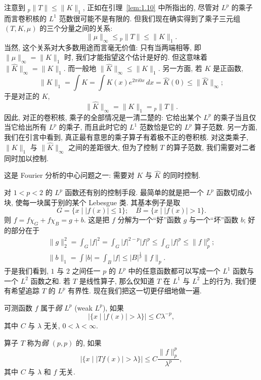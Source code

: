\begin{remark}\label{rem:1.17}
注意到 ${}_p\|T\|\leq\|K\|_1$, 正如在引理~\ref{lem:1.10} 中所指出的, 尽管对 $L^p$ 的乘子而言卷积核的 $L^1$ 范数很可能不是有限的. 但我们现在确实得到了乘子三元组 $(T,K,\mu)$ 的三个分量之间的关系:
\[
\|\mu\|_{\infty}\leq{}_p\|T\|\leq\|K\|_1.
\]
当然, 这个关系对大多数用途而言毫无价值: 只有当两端相等, 即 $\|\mu\|_{\infty}=\|K\|_1$ 时, 我们才能指望这个估计是好的. 但这意味着 $\|\hat{K}\|_{\infty}=\|K\|_1$. 而一般地 $\|\hat{K}\|_{\infty}\leq\|K\|_1$. 另一方面, 若 $K$ 是正函数,
\[
\|K\|_1=\int K=\int K(x)e^{2\pi i0x}\,dx=\hat{K}(0)\leq\|\hat{K}\|_{\infty};
\]
于是对正的 $K$,
\[
\|\hat{K}\|_{\infty}=\|K\|_1={}_p\|T\|.
\]
因此, 对正的卷积核, 乘子的全部情况是一清二楚的: 它给出某个 $L^p$ 的乘子当且仅当它给出所有 $L^p$ 的乘子, 而且此时它的 $L^1$ 范数恰是它的 $L^p$ 算子范数. 另一方面, 我们在引言中看到, 真正最有意思的乘子算子有着极不正的卷积核. 对这类乘子, $\|K\|_1$ 与 $\|\hat{K}\|_{\infty}$ 之间的差距很大, 但为了控制 $T$ 的算子范数, 我们需要对二者同时加以控制.

这是 Fourier 分析的中心问题之一: 需要对 $K$ 与 $\hat{K}$ 的同时控制.
\end{remark}

\begin{remark}\label{rem:1.18}
对 $1<p<2$ 的 $L^p$ 函数还有别的控制手段. 最简单的就是把一个 $L^p$ 函数切成小块, 使每一块属于别的某个 Lebesgue 类. 其基本例子是取
\[
G=\{x \mid |f(x)|\leq 1\};\quad B=\{x \mid |f(x)|>1\}.
\]
则 $f=f\chi_G+f\chi_B=g+b$. 这是把 $f$ 分解为一个``好''函数 $g$ 与一个``坏''函数 $b$; 好的部分在于
\begin{gather*}
\|g\|_2^2=\int_G|f|^2=\int_G|f|^{2-p}|f|^p\leq\int_G|f|^p\leq\|f\|_p^p; \\
\|b\|_1=\int|b|=\int_B|f|\leq|B|^{\frac{1}{p}}\|f\|_p.
\end{gather*}
于是我们看到, $1$ 与 $2$ 之间任一 $p$ 的 $L^p$ 中的任意函数都可以写成一个 $L^1$ 函数与一个 $L^2$ 函数之和. 若 $T$ 是线性算子, 那么仅知道 $T$ 在 $L^1$ 与 $L^2$ 上的行为, 我们便有希望追踪 $T$ 的 $L^p$ 有界性. 现在我们把这一切更仔细地做一遍.
\end{remark}

\begin{definition}\label{def:1.19}
可测函数 $f$ 属于\emph{弱 $L^p$} (weak $L^p$), 如果
\[
|\{x \mid |f(x)|>\lambda\}|\leq C\lambda^{-p},
\]
其中 $C$ 与 $\lambda$ 无关, $0<\lambda<\infty$.

算子 $T$ 称为\emph{弱 $(p,p)$} 的, 如果
\[
|\{x \mid |Tf(x)|>\lambda\}|\leq C\frac{\|f\|_p^p}{\lambda^p},
\]
其中 $C$ 与 $\lambda$ 和 $f$ 无关.
\end{definition}

